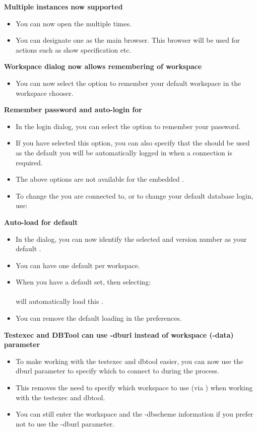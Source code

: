 \textbf{Multiple \gdtestcasebrowser{} instances now supported}
\begin{itemize}
\item You can now open the \gdtestcasebrowser{} multiple times.
\item You can designate one \gdtestcasebrowser{} as the main browser. This browser will be used for actions such as show specification etc.
\end{itemize}

\textbf{Workspace dialog now allows remembering of workspace}
\begin{itemize}
\item You can now select the option to remember your default workspace in the workspace chooser.
\end{itemize}

\textbf{Remember password and auto-login for \gddb{}}
\begin{itemize}
\item In the \gddb{} login dialog, you can select the option to remember your password. 
\item If you have selected this option, you can also specify that the \gddb{} should be used as the default \gddb{} you will be automatically logged in when a \gddb{} connection is required. 
\item The above options are not available for the embedded \gddb{}.
\item To change the \gddb{} you are connected to, or to change your default database login, use:\\
\end{itemize}

\textbf{Auto-load for default \gdproject{}}
\begin{itemize}
\item In the  dialog, you can now identify the selected \gdproject{} and version number as your default \gdproject{}.
\item You can have one default \gdproject{} per workspace. 
\item When you have a default \gdproject{} set, then selecting:\\
\\
will automatically load this \gdproject{}.
\item You can remove the default loading in the  preferences. 
\end{itemize}

\textbf{Testexec and DBTool can use -dburl instead of workspace (-data) parameter}
\begin{itemize}
\item To make working with the testexec and dbtool easier, you can now use the dburl parameter to specify which \gddb{} to connect to during the process.
\item This removes the need to specify which workspace to use (via ) when working with the testexec and dbtool. 
\item You can still enter the workspace and the -dbscheme information if you prefer not to use the -dburl parameter. 
\end{itemize}

